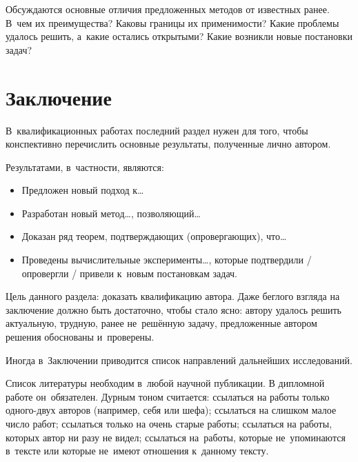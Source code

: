 \documentclass[12pt,fleqn]{article}
\begin{document}
Обсуждаются основные отличия предложенных методов от известных ранее. 
В~чем их преимущества? 
Каковы границы их применимости? 
Какие проблемы удалось решить, а~какие остались открытыми? 
Какие возникли новые постановки задач?

\section{Заключение}

В~квалификационных работах последний раздел нужен для того, чтобы 
конспективно перечислить основные результаты, полученные лично автором. 

Результатами, в~частности, являются:
\begin{itemize}
\item 
    Предложен новый подход к\dots
\item 
    Разработан новый метод\dots, позволяющий\dots
\item 
    Доказан ряд теорем, подтверждающих (опровергающих), что\dots
\item 
    Проведены вычислительные эксперименты\dots,
    которые подтвердили / опровергли / привели к~новым постановкам задач.
\end{itemize}
    
Цель данного раздела: доказать квалификацию автора. 
Даже беглого взгляда на заключение должно быть достаточно, чтобы стало ясно: 
автору удалось решить актуальную, трудную, ранее не~решённую задачу, 
предложенные автором решения обоснованы и~проверены.

Иногда в~Заключении приводится список направлений дальнейших исследований.

\newpage
Список литературы необходим в~любой научной публикации. 
В дипломной работе он~обязателен. 
Дурным тоном считается:
ссылаться на работы только одного-двух авторов (например, себя или шефа);
ссылаться на слишком малое число работ;
ссылаться только на очень старые работы;
ссылаться на работы, которых автор ни разу не видел;
ссылаться на~работы, которые не~упоминаются в~тексте
или которые не~имеют отношения к~данному тексту.
\end{document}
